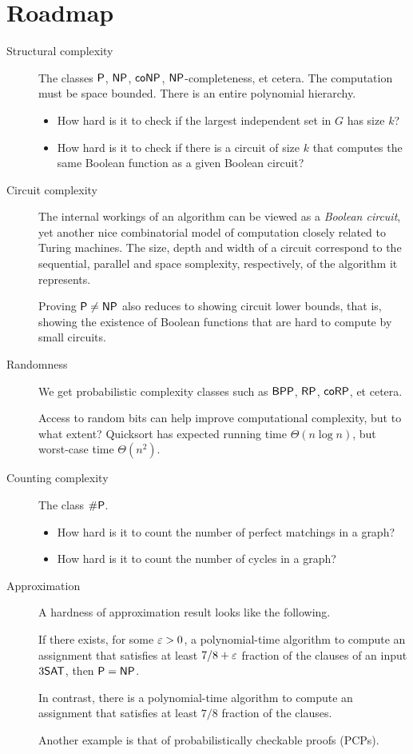 \section*{Roadmap}
\begin{description}
    \item[Structural complexity] The classes $\P$, $\NP$, $\coNP$,
        $\NP$-completeness, et cetera.
        The computation must be space bounded. 
        There is an entire polynomial hierarchy.
        \begin{itemize}
            \item How hard is it to check if the largest independent set in
                $G$ has size $k$?
            \item How hard is it to check if there is a circuit of size $k$
                that computes the same Boolean function as a given
                Boolean circuit?
        \end{itemize}
    \item[Circuit complexity] The internal workings of an algorithm can be
        viewed as a \emph{Boolean circuit}, yet another nice combinatorial
        model of computation closely related to Turing machines.
        The size, depth and width of a circuit correspond to the sequential,
        parallel and space somplexity, respectively, of the algorithm it
        represents.

        Proving $\P \ne \NP$ also reduces to showing circuit lower bounds,
        that is, showing the existence of Boolean functions that are hard to
        compute by small circuits.
    \item[Randomness] We get probabilistic complexity classes such as
        $\BPP$, $\RP$, $\coRP$, et cetera.

        Access to random bits can help improve computational complexity,
        but to what extent?
        Quicksort has expected running time $\Theta(n \log n)$, but
        worst-case time $\Theta(n^2)$.
    \item[Counting complexity] The class $\sP$.
        \begin{itemize}
            \item How hard is it to count the number of perfect matchings
                in a graph?
            \item How hard is it to count the number of cycles in a graph?
        \end{itemize}
    \item[Approximation]
        A hardness of approximation result looks like the following.
        \begin{theorem}[Hastad, 1997]
            If there exists, for some $\eps > 0$, a polynomial-time
            algorithm to compute an assignment that satisfies at least
            $7/8 + \eps$ fraction of the clauses of an input $3\SAT$,
            then $\P = \NP$.
        \end{theorem}
        In contrast, there is a polynomial-time algorithm to compute an
        assignment that satisfies at least $7/8$ fraction of the clauses.

        Another example is that of probabilistically checkable proofs
        (PCPs).
\end{description}

